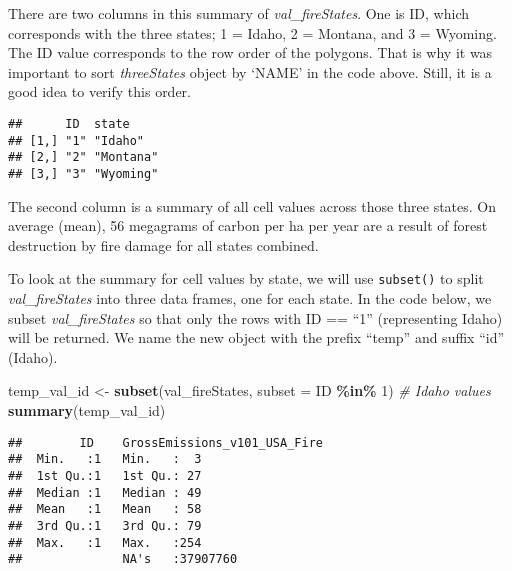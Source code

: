 \documentclass[
]{article}
\newenvironment{Shaded}{\begin{snugshade}}{\end{snugshade}}
\newcommand{\AttributeTok}[1]{\textcolor[rgb]{0.13,0.29,0.53}{#1}}
\newcommand{\CommentTok}[1]{\textcolor[rgb]{0.56,0.35,0.01}{\textit{#1}}}
\newcommand{\DecValTok}[1]{\textcolor[rgb]{0.00,0.00,0.81}{#1}}
\newcommand{\FunctionTok}[1]{\textcolor[rgb]{0.13,0.29,0.53}{\textbf{#1}}}
\newcommand{\NormalTok}[1]{#1}
\newcommand{\OtherTok}[1]{\textcolor[rgb]{0.56,0.35,0.01}{#1}}
\newcommand{\SpecialCharTok}[1]{\textcolor[rgb]{0.81,0.36,0.00}{\textbf{#1}}}
\newcommand{\StringTok}[1]{\textcolor[rgb]{0.31,0.60,0.02}{#1}}
\begin{document}
There are two columns in this summary of \emph{val\_fireStates}. One is
ID, which corresponds with the three states; 1 = Idaho, 2 = Montana, and
3 = Wyoming. The ID value corresponds to the row order of the polygons.
That is why it was important to sort \emph{threeStates} object by `NAME'
in the code above. Still, it is a good idea to verify this order.

\begin{Shaded}
\end{Shaded}

\begin{verbatim}
##      ID  state    
## [1,] "1" "Idaho"  
## [2,] "2" "Montana"
## [3,] "3" "Wyoming"
\end{verbatim}

The second column is a summary of all cell values across those three
states. On average (mean), 56 megagrams of carbon per ha per year are a
result of forest destruction by fire damage for all states combined.

To look at the summary for cell values by state, we will use
\texttt{subset()} to split \emph{val\_fireStates} into three data
frames, one for each state. In the code below, we subset
\emph{val\_fireStates} so that only the rows with ID == ``1''
(representing Idaho) will be returned. We name the new object with the
prefix ``temp'' and suffix ``id'' (Idaho).

\begin{Shaded}
\begin{Highlighting}[]
\NormalTok{temp\_val\_id }\OtherTok{\textless{}{-}} \FunctionTok{subset}\NormalTok{(val\_fireStates, }\AttributeTok{subset =}\NormalTok{ ID }\SpecialCharTok{\%in\%} \DecValTok{1}\NormalTok{)  }\CommentTok{\# Idaho values}
\FunctionTok{summary}\NormalTok{(temp\_val\_id) }
\end{Highlighting}
\end{Shaded}

\begin{verbatim}
##        ID    GrossEmissions_v101_USA_Fire
##  Min.   :1   Min.   :  3                 
##  1st Qu.:1   1st Qu.: 27                 
##  Median :1   Median : 49                 
##  Mean   :1   Mean   : 58                 
##  3rd Qu.:1   3rd Qu.: 79                 
##  Max.   :1   Max.   :254                 
##              NA's   :37907760
\end{verbatim}
\end{document}
